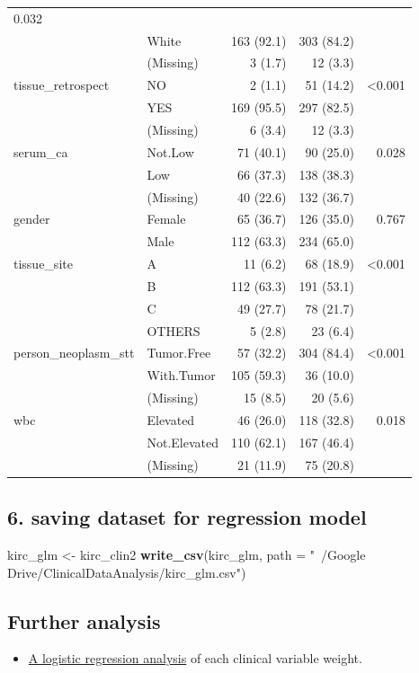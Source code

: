 \documentclass[]{article}
\newenvironment{Shaded}{\begin{snugshade}}{\end{snugshade}}
\newcommand{\KeywordTok}[1]{\textcolor[rgb]{0.13,0.29,0.53}{\textbf{#1}}}
\newcommand{\DataTypeTok}[1]{\textcolor[rgb]{0.13,0.29,0.53}{#1}}
\newcommand{\StringTok}[1]{\textcolor[rgb]{0.31,0.60,0.02}{#1}}
\newcommand{\NormalTok}[1]{#1}
\providecommand{\tightlist}{%
  \setlength{\itemsep}{0pt}\setlength{\parskip}{0pt}}
\begin{document}
\begin{longtable}[]{@{}llrrr@{}}
0.032\tabularnewline
& White & 163 (92.1) & 303 (84.2) &\tabularnewline
& (Missing) & 3 (1.7) & 12 (3.3) &\tabularnewline
tissue\_retrospect & NO & 2 (1.1) & 51 (14.2) &
\textless{}0.001\tabularnewline
& YES & 169 (95.5) & 297 (82.5) &\tabularnewline
& (Missing) & 6 (3.4) & 12 (3.3) &\tabularnewline
serum\_ca & Not.Low & 71 (40.1) & 90 (25.0) & 0.028\tabularnewline
& Low & 66 (37.3) & 138 (38.3) &\tabularnewline
& (Missing) & 40 (22.6) & 132 (36.7) &\tabularnewline
gender & Female & 65 (36.7) & 126 (35.0) & 0.767\tabularnewline
& Male & 112 (63.3) & 234 (65.0) &\tabularnewline
tissue\_site & A & 11 (6.2) & 68 (18.9) &
\textless{}0.001\tabularnewline
& B & 112 (63.3) & 191 (53.1) &\tabularnewline
& C & 49 (27.7) & 78 (21.7) &\tabularnewline
& OTHERS & 5 (2.8) & 23 (6.4) &\tabularnewline
person\_neoplasm\_stt & Tumor.Free & 57 (32.2) & 304 (84.4) &
\textless{}0.001\tabularnewline
& With.Tumor & 105 (59.3) & 36 (10.0) &\tabularnewline
& (Missing) & 15 (8.5) & 20 (5.6) &\tabularnewline
wbc & Elevated & 46 (26.0) & 118 (32.8) & 0.018\tabularnewline
& Not.Elevated & 110 (62.1) & 167 (46.4) &\tabularnewline
& (Missing) & 21 (11.9) & 75 (20.8) &\tabularnewline
\bottomrule
\end{longtable}

\subsection{6. saving dataset for regression
model}\label{saving-dataset-for-regression-model}

\begin{Shaded}
\begin{Highlighting}[]
\NormalTok{kirc_glm <-}\StringTok{ }\NormalTok{kirc_clin2 }
\KeywordTok{write_csv}\NormalTok{(kirc_glm, }\DataTypeTok{path =} \StringTok{"~/Google Drive/ClinicalDataAnalysis/kirc_glm.csv"}\NormalTok{)}
\end{Highlighting}
\end{Shaded}

\subsection{Further analysis}\label{further-analysis}

\begin{itemize}
\tightlist
\item
  \href{3.logistic_regression.md}{A logistic regression analysis} of
  each clinical variable weight.
\end{itemize}
\end{document}
